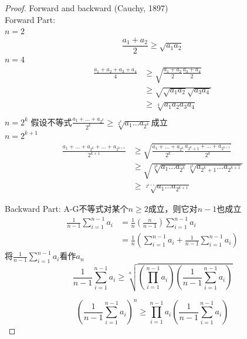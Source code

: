 \documentclass[10pt,a4paper]{book}
\begin{document}
	
	\begin{proof}\label{证明 2}
	Forward and backward (Cauchy, 1897)\\
	Forward Part:\\
	$ n=2 $ 
	\begin{equation}
		\frac{a_1+a_2}{2}\geq \sqrt{a_1a_2}
	\end{equation}
	$ n=4 $ 
	\begin{equation}
		\begin{aligned}
			\frac{a_1+a_2+a_3+a_4}{4}
			&\geq \sqrt{\frac{a_1+a_2}{2}\frac{a_3+a_4}{2}}\\
			&\geq \sqrt{\sqrt{a_1a_2}\sqrt{a_3a_4}}\\
			&\geq \sqrt[4]{a_1a_2a_3a_4}\\
		\end{aligned}
	\end{equation}
	$ n=2^k $ 假设不等式$ \frac{a_1+\dots +a_{2^k}}{2^k}\geq \sqrt[2^k]{a_1\dots a_{2^k}} $成立\\
	$ n=2^{k+1} $
	\begin{equation}
		\begin{aligned}
			\frac{a_1+\dots+a_{2^k}+\dots+a_{2^{k+1}}}{2^{k+1}}
			&\geq \sqrt{\frac{a_1+\dots +a_{2^k}}{2^k}\frac{a_{2^k+1}+\dots +a_{2^{k+1}}}{2^k}}\\
			&\geq \sqrt{\sqrt[2^k]{a_1\dots a_{2^k}}\sqrt[2^k]{a_{2^k+1}\dots a_{2^{k+1}}}}\\
			&\geq \sqrt[2^{k+1}]{a_1\dots a_{2^{k+1}}}
		\end{aligned}
	\end{equation}
	
	Backward Part:
	A-G不等式对某个$ n\geq 2 $成立，则它对$ n-1 $也成立
	\begin{equation}
		\begin{aligned}
			\frac{1}{n-1}\sum_{i=1}^{n-1}a_i 
			&= \frac{1}{n}(\frac{n}{n-1})\sum_{i=1}^{n-1}a_i\\
			&=\frac{1}{n}(\sum_{i=1}^{n-1}a_i+\frac{1}{n-1}\sum_{i=1}^{n-1}a_i)
		\end{aligned}
	\end{equation}
	将$ \frac{1}{n-1}\sum_{i=1}^{n-1}a_i $看作$ a_n $
	\begin{equation}
		\frac{1}{n-1}\sum_{i=1}^{n-1}a_i
		\geq \sqrt[n]{(\prod_{i=1}^{n-1}a_i) (\frac{1}{n-1}\sum_{i=1}^{n-1}a_i)}
	\end{equation}
	
	\begin{equation}	
		(\frac{1}{n-1}\sum_{i=1}^{n-1}a_i)^n
		\geq \prod_{i=1}^{n-1}a_i(\frac{1}{n-1}\sum_{i=1}^{n-1}a_i)
	\end{equation}
	


\end{proof}
\end{document}
